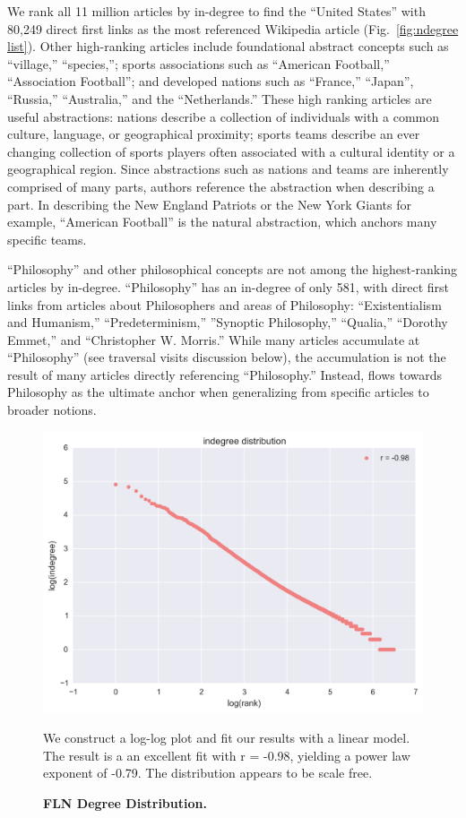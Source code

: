 \documentclass[pre,twocolumn,twoside,superscriptaddress,floatfix, aps, 10pt]{revtex4-1}
\begin{document}
We rank all 11 million articles by in-degree to find 
the ``United States'' with 80,249 direct first links as the most referenced
Wikipedia article 
(Fig.~\ref{fig:ndegree list}). 
Other high-ranking articles
include foundational abstract concepts such as ``village,'' ``species,''; 
sports associations such as ``American Football,'' ``Association Football''; 
and developed nations such as ``France,'' ``Japan'', ``Russia,'' ``Australia,'' and 
the ``Netherlands.'' These high ranking articles are useful abstractions: nations
describe a collection of individuals with a common culture, language, or 
geographical proximity; sports teams describe an ever changing collection of 
sports players often associated with a cultural identity or a geographical 
region. 
Since abstractions such as nations and teams are inherently comprised
of many parts, authors reference the abstraction when describing a part.
In describing the New England Patriots or the New York Giants
for example, ``American Football'' is the natural abstraction, which 
anchors many specific teams.

``Philosophy'' and other philosophical concepts
are not among the highest-ranking articles by in-degree.
``Philosophy'' has an in-degree of only 581, with direct first links from articles about Philosophers and areas of Philosophy: ``Existentialism and Humanism,'' ``Predeterminism,'' ''Synoptic Philosophy,'' ``Qualia,'' ``Dorothy Emmet,'' and ``Christopher W. Morris.''
While many articles accumulate at ``Philosophy'' (see traversal visits discussion below), 
the accumulation is not the 
result of many articles directly referencing ``Philosophy.'' 
Instead, flows towards Philosophy as the 
ultimate anchor when generalizing from specific articles to broader notions.

\begin{figure}[tp!]
  \centering	
  \includegraphics[width=\columnwidth]{graphics/ndegree_loglog.png}
  \caption{
    \textbf{FLN Degree Distribution.}
  }
  We construct a log-log plot and fit our results with a linear model. The result is a 
  an excellent fit with r = -0.98, yielding a power law exponent of -0.79. 
  The distribution appears to be scale free.
  \label{fig:degree distribution}
\end{figure}
\end{document}
